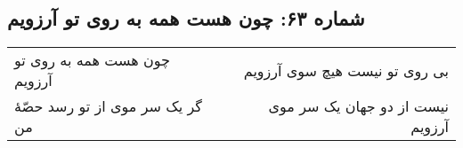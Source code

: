 \begin{center}
\section*{شماره ۶۳: چون هست همه به روی تو آرزویم}
\label{sec:063}
\begin{longtable}{l p{0.5cm} r}
چون هست همه به روی تو آرزویم
&&
بی روی تو نیست هیچ سوی آرزویم
\\
گر یک سر موی از تو رسد حصّهٔ من
&&
نیست از دو جهان یک سر موی آرزویم
\\
\end{longtable}
\end{center}
